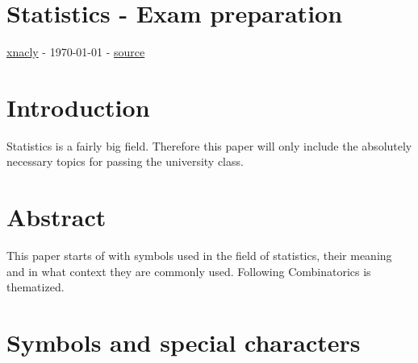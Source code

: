 \documentclass[twoside, a4paper, twocolumn]{article}
\begin{document}
    \section*{Statistics - Exam preparation}
    \href{https://xnacly.me}{xnacly} 
    - \today 
    - \href{https://github.com/xnacly/statistics}{source}

    \tableofcontents

    \section{Introduction}
    Statistics is a fairly big field. Therefore this paper will only include
    the absolutely necessary topics for passing the university class.

    \section{Abstract}
    This paper starts of with symbols used in the field of statistics, their
    meaning and in what context they are commonly used. Following Combinatorics
    is thematized.

    \section{Symbols and special characters}
\end{document}
